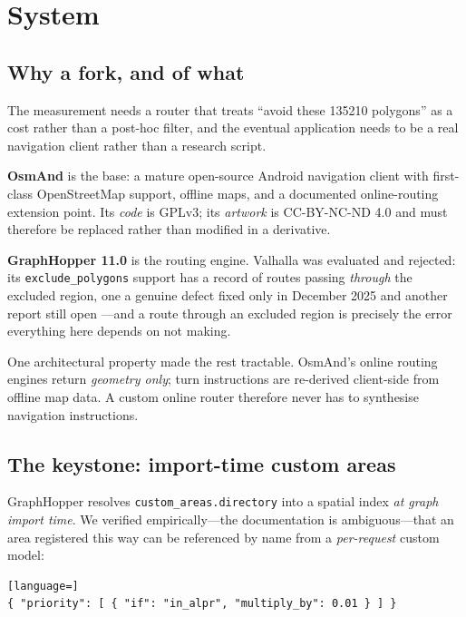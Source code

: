 \documentclass[11pt,twoside]{article}
\begin{document}
\section{System}
\label{sec:system}

\subsection{Why a fork, and of what}

The measurement needs a router that treats ``avoid these \num{135210} polygons'' as a
cost rather than a post-hoc filter, and the eventual application needs to be a real
navigation client rather than a research script.

\textbf{OsmAnd} \citep{osmand} is the base: a mature open-source Android navigation client
with first-class OpenStreetMap support, offline maps, and a documented online-routing
extension point. Its \emph{code} is GPLv3; its \emph{artwork} is CC-BY-NC-ND 4.0 and must
therefore be replaced rather than modified in a derivative.

\textbf{GraphHopper 11.0} \citep{graphhopper11} is the routing engine. Valhalla was
evaluated and rejected: its \texttt{exclude\_polygons} support has a record of routes passing
\emph{through} the excluded region, one a genuine defect fixed only in December 2025
\citep{valhalla5069} and another report still open \citep{valhalla4659}---and a route through
an excluded region is precisely the error everything here depends on not making.

One architectural property made the rest tractable. OsmAnd's online routing engines return
\emph{geometry only}; turn instructions are re-derived client-side from offline map data.
A custom online router therefore never has to synthesise navigation instructions.

\subsection{The keystone: import-time custom areas}

GraphHopper resolves \texttt{custom\_areas.directory} into a spatial index \emph{at graph
import time}. We verified empirically---the documentation is ambiguous---that an area
registered this way can be referenced by name from a \emph{per-request} custom model:

\begin{lstlisting}[language=]
{ "priority": [ { "if": "in_alpr", "multiply_by": 0.01 } ] }
\end{lstlisting}
\end{document}
